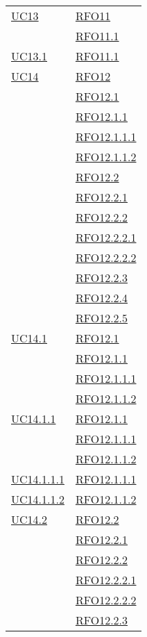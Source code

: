 \begin{longtable}{|>{\centering}m{5cm}|m{5cm}<{\centering}|}
\hyperlink{UC13}{UC13} & \hyperlink{RFO11}{RFO11}\\
& \hyperlink{RFO11.1}{RFO11.1}\\\hline
\hyperlink{UC13.1}{UC13.1} & \hyperlink{RFO11.1}{RFO11.1}\\\hline
\hyperlink{UC14}{UC14} & \hyperlink{RFO12}{RFO12}\\
& \hyperlink{RFO12.1}{RFO12.1}\\
& \hyperlink{RFO12.1.1}{RFO12.1.1}\\
& \hyperlink{RFO12.1.1.1}{RFO12.1.1.1}\\
& \hyperlink{RFO12.1.1.2}{RFO12.1.1.2}\\
& \hyperlink{RFO12.2}{RFO12.2}\\
& \hyperlink{RFO12.2.1}{RFO12.2.1}\\
& \hyperlink{RFO12.2.2}{RFO12.2.2}\\
& \hyperlink{RFO12.2.2.1}{RFO12.2.2.1}\\
& \hyperlink{RFO12.2.2.2}{RFO12.2.2.2}\\
& \hyperlink{RFO12.2.3}{RFO12.2.3}\\
& \hyperlink{RFO12.2.4}{RFO12.2.4}\\
& \hyperlink{RFO12.2.5}{RFO12.2.5}\\\hline
\hyperlink{UC14.1}{UC14.1} & \hyperlink{RFO12.1}{RFO12.1}\\
& \hyperlink{RFO12.1.1}{RFO12.1.1}\\
& \hyperlink{RFO12.1.1.1}{RFO12.1.1.1}\\
& \hyperlink{RFO12.1.1.2}{RFO12.1.1.2}\\\hline
\hyperlink{UC14.1.1}{UC14.1.1} & \hyperlink{RFO12.1.1}{RFO12.1.1}\\
& \hyperlink{RFO12.1.1.1}{RFO12.1.1.1}\\
& \hyperlink{RFO12.1.1.2}{RFO12.1.1.2}\\\hline
\hyperlink{UC14.1.1.1}{UC14.1.1.1} & \hyperlink{RFO12.1.1.1}{RFO12.1.1.1}\\\hline
\hyperlink{UC14.1.1.2}{UC14.1.1.2} & \hyperlink{RFO12.1.1.2}{RFO12.1.1.2}\\\hline
\hyperlink{UC14.2}{UC14.2} & \hyperlink{RFO12.2}{RFO12.2}\\
& \hyperlink{RFO12.2.1}{RFO12.2.1}\\
& \hyperlink{RFO12.2.2}{RFO12.2.2}\\
& \hyperlink{RFO12.2.2.1}{RFO12.2.2.1}\\
& \hyperlink{RFO12.2.2.2}{RFO12.2.2.2}\\
& \hyperlink{RFO12.2.3}{RFO12.2.3}\\

\end{longtable}
